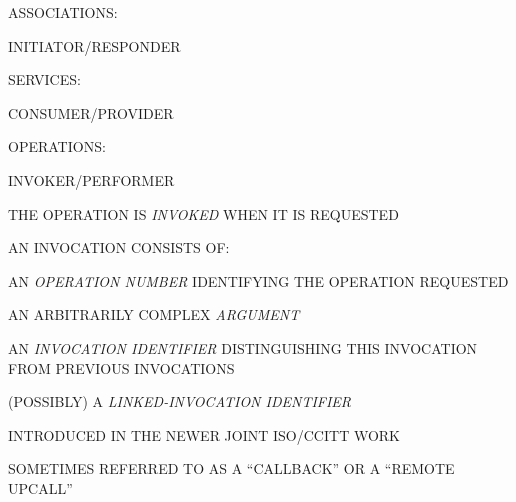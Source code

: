 \begin{bwslide}
\begin{nrtc}
\item	ASSOCIATIONS: 
    \begin{nrtc}
    \item	INITIATOR/RESPONDER
    \end{nrtc}

\item	SERVICES: 
    \begin{nrtc}
    \item	CONSUMER/PROVIDER
    \end{nrtc}

\item	OPERATIONS: 
    \begin{nrtc}
    \item	INVOKER/PERFORMER
    \end{nrtc}
\end{nrtc}
\end{bwslide}


\begin{bwslide}

\begin{nrtc}
\item	THE OPERATION IS \emph{INVOKED} WHEN IT IS REQUESTED

\item	AN INVOCATION CONSISTS OF:
    \begin{nrtc}
    \item	AN \emph{OPERATION NUMBER} IDENTIFYING THE OPERATION REQUESTED

    \item	AN ARBITRARILY COMPLEX \emph{ARGUMENT}

    \item	AN \emph{INVOCATION IDENTIFIER} DISTINGUISHING THIS INVOCATION
		FROM PREVIOUS INVOCATIONS

    \item	(POSSIBLY) A \emph{LINKED-INVOCATION IDENTIFIER}
    \end{nrtc}
\end{nrtc}
\end{bwslide}


\begin{bwslide}

\begin{nrtc}
\item	INTRODUCED IN THE NEWER JOINT ISO/CCITT WORK

\item	SOMETIMES REFERRED TO AS A ``CALLBACK'' OR A ``REMOTE UPCALL''
\end{nrtc}
\end{bwslide}


